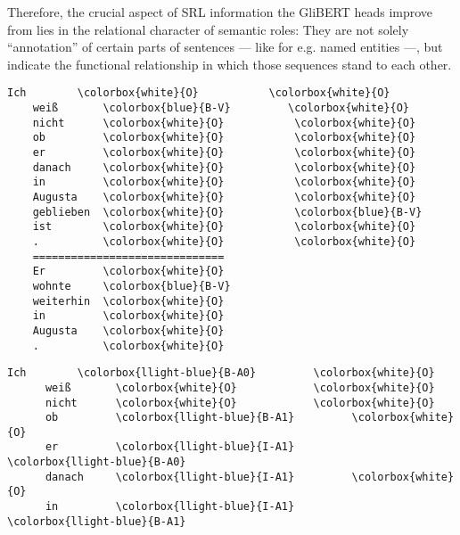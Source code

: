 {Therefore, the crucial aspect of SRL information the GliBERT heads improve from lies
in the relational character of semantic roles: They are not solely ``annotation'' of certain parts of
sentences --- like for e.g. named entities ---, but indicate the functional relationship
in which those sequences stand to each other.

\begingroup
\begin{srl}[!h]
\centering
  \begin{minipage}{0.45\linewidth}
  \vspace{0pt}
    \begin{BVerbatim}[commandchars=\\\{\}, fontsize=\footnotesize]
    Ich        \colorbox{white}{O}           \colorbox{white}{O}
    weiß       \colorbox{blue}{B-V}         \colorbox{white}{O}
    nicht      \colorbox{white}{O}           \colorbox{white}{O}
    ob         \colorbox{white}{O}           \colorbox{white}{O}
    er         \colorbox{white}{O}           \colorbox{white}{O}
    danach     \colorbox{white}{O}           \colorbox{white}{O}
    in         \colorbox{white}{O}           \colorbox{white}{O}
    Augusta    \colorbox{white}{O}           \colorbox{white}{O}
    geblieben  \colorbox{white}{O}           \colorbox{blue}{B-V}
    ist        \colorbox{white}{O}           \colorbox{white}{O}
    .          \colorbox{white}{O}           \colorbox{white}{O}
    ==============================
    Er         \colorbox{white}{O}
    wohnte     \colorbox{blue}{B-V}
    weiterhin  \colorbox{white}{O}
    in         \colorbox{white}{O}
    Augusta    \colorbox{white}{O}
    .          \colorbox{white}{O}
    \end{BVerbatim}
  \end{minipage}
  \hfill
  \begin{minipage}{0.45\linewidth}
  \vspace{0pt}
    \begin{BVerbatim}[commandchars=\\\{\}, fontsize=\footnotesize]
      Ich        \colorbox{llight-blue}{B-A0}         \colorbox{white}{O}
      weiß       \colorbox{white}{O}            \colorbox{white}{O}
      nicht      \colorbox{white}{O}            \colorbox{white}{O}
      ob         \colorbox{llight-blue}{B-A1}         \colorbox{white}{O}
      er         \colorbox{llight-blue}{I-A1}         \colorbox{llight-blue}{B-A0}
      danach     \colorbox{llight-blue}{I-A1}         \colorbox{white}{O}
      in         \colorbox{llight-blue}{I-A1}         \colorbox{llight-blue}{B-A1}

\end{BVerbatim}
\end{minipage}
\end{srl}}
